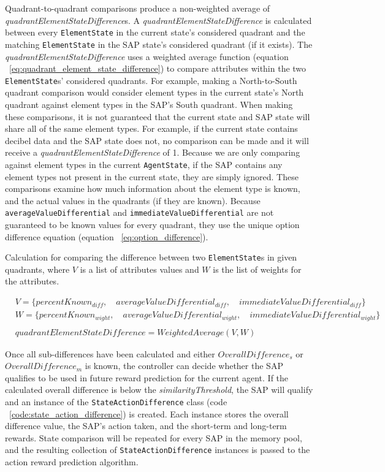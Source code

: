 Quadrant-to-quadrant comparisons produce a non-weighted average of \textit{quadrantElementStateDifference}s.
A \textit{quadrantElementStateDifference} is calculated between every \texttt{ElementState} in the current state's considered quadrant and the matching \texttt{ElementState} in the SAP state's considered quadrant (if it exists).
The \textit{quadrantElementStateDifference} uses a weighted average function (equation ~\ref{eq:quadrant_element_state_difference}) to compare attributes within the two \texttt{ElementState}s' considered quadrants.
For example, making a North-to-South quadrant comparison would consider element types in the current state's North quadrant against element types in the SAP's South quadrant.
When making these comparisons, it is not guaranteed that the current state and SAP state will share all of the same element types.
For example, if the current state contains decibel data and the SAP state does not, no comparison can be made and it will receive a \textit{quadrantElementStateDifference} of 1.
Because we are only comparing against element types in the current \texttt{AgentState}, if the SAP contains any element types not present in the current state, they are simply ignored.
These comparisons examine how much information about the element type is known, and the actual values in the quadrants (if they are known).
Because \texttt{averageValueDifferential} and \texttt{immediateValueDifferential} are not guaranteed to be known values for every quadrant, they use the unique option difference equation (equation ~\ref{eq:option_difference}).

\caption{Calculation for comparing the difference between two \texttt{ElementState}s in given quadrants, where $V$ is a list of attributes values and $W$ is the list of weights for the attributes.}
\begin{equation} \label{eq:quadrant_element_state_difference}
\begin{align}
  &V = \{percentKnown_{diff},\quad averageValueDifferential_{diff},\quad immediateValueDifferential_{diff}\} \\
  &W = \{percentKnown_{wight},\quad averageValueDifferential_{wight},\quad immediateValueDifferential_{wight}\} \\
  &\\
  &quadrantElementStateDifference = WeightedAverage(V,W)
\end{align}
\end{equation}

Once all sub-differences have been calculated and either $OverallDifference_{s}$ or $OverallDifference_{m}$ is known, the controller can decide whether the SAP qualifies to be used in future reward prediction for the current agent.
If the calculated overall difference is below the \textit{similarityThreshold}, the SAP will qualify and an instance of the \texttt{StateActionDifference} class (code ~\ref{code:state_action_difference}) is created.
Each instance stores the overall difference value, the SAP's action taken, and the short-term and long-term rewards.
State comparison will be repeated for every SAP in the memory pool, and the resulting collection of \texttt{StateActionDifference} instances is passed to the action reward prediction algorithm.

